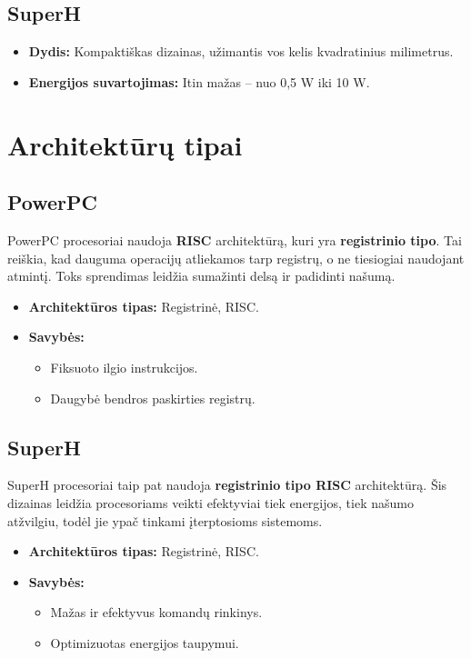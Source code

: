 \documentclass{article}
\begin{document}
\subsection{SuperH}
\begin{itemize}
    \item \textbf{Dydis:} Kompaktiškas dizainas, užimantis vos kelis kvadratinius milimetrus.
    \item \textbf{Energijos suvartojimas:} Itin mažas – nuo 0,5 W iki 10 W.
\end{itemize}

\section{Architektūrų tipai}
\subsection{PowerPC}
PowerPC procesoriai naudoja \textbf{RISC} architektūrą, kuri yra \textbf{registrinio tipo}. Tai reiškia, kad dauguma operacijų atliekamos tarp registrų, o ne tiesiogiai naudojant atmintį. Toks sprendimas leidžia sumažinti delsą ir padidinti našumą.

\begin{itemize}
    \item \textbf{Architektūros tipas:} Registrinė, RISC.
    \item \textbf{Savybės:}
        \begin{itemize}
            \item Fiksuoto ilgio instrukcijos.
            \item Daugybė bendros paskirties registrų.
        \end{itemize}
\end{itemize}

\subsection{SuperH}
SuperH procesoriai taip pat naudoja \textbf{registrinio tipo RISC} architektūrą. Šis dizainas leidžia procesoriams veikti efektyviai tiek energijos, tiek našumo atžvilgiu, todėl jie ypač tinkami įterptosioms sistemoms.

\begin{itemize}
    \item \textbf{Architektūros tipas:} Registrinė, RISC.
    \item \textbf{Savybės:}
        \begin{itemize}
            \item Mažas ir efektyvus komandų rinkinys.
            \item Optimizuotas energijos taupymui.
        \end{itemize}
\end{itemize}


 
\end{document}

